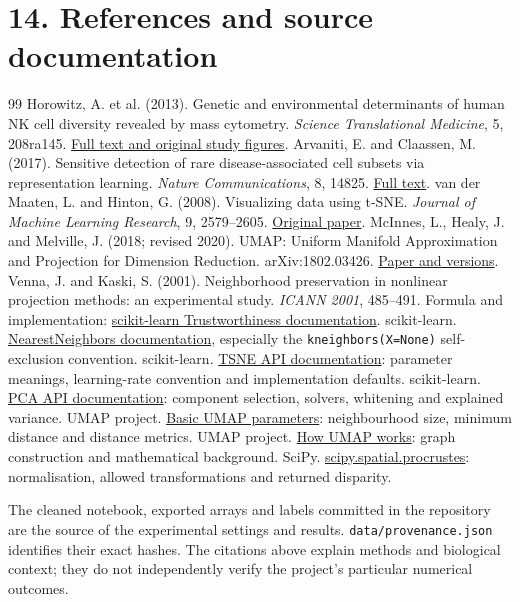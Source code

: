 \documentclass[11pt]{article}
\begin{document}
\section*{14. References and source documentation}
\begingroup\small
\renewcommand{\refname}{}
\begin{thebibliography}{99}
 Horowitz, A. et al. (2013). Genetic and environmental determinants of human NK cell diversity revealed by mass cytometry. \emph{Science Translational Medicine}, 5, 208ra145. \href{https://pmc.ncbi.nlm.nih.gov/articles/PMC3918221/}{Full text and original study figures}.
 Arvaniti, E. and Claassen, M. (2017). Sensitive detection of rare disease-associated cell subsets via representation learning. \emph{Nature Communications}, 8, 14825. \href{https://pmc.ncbi.nlm.nih.gov/articles/PMC5384229/}{Full text}.
 van der Maaten, L. and Hinton, G. (2008). Visualizing data using t-SNE. \emph{Journal of Machine Learning Research}, 9, 2579--2605. \href{https://www.jmlr.org/papers/v9/vandermaaten08a.html}{Original paper}.
 McInnes, L., Healy, J. and Melville, J. (2018; revised 2020). UMAP: Uniform Manifold Approximation and Projection for Dimension Reduction. arXiv:1802.03426. \href{https://arxiv.org/abs/1802.03426}{Paper and versions}.
 Venna, J. and Kaski, S. (2001). Neighborhood preservation in nonlinear projection methods: an experimental study. \emph{ICANN 2001}, 485--491. Formula and implementation: \href{https://scikit-learn.org/stable/modules/generated/sklearn.manifold.trustworthiness.html}{scikit-learn Trustworthiness documentation}.
 scikit-learn. \href{https://scikit-learn.org/stable/modules/generated/sklearn.neighbors.NearestNeighbors.html}{NearestNeighbors documentation}, especially the \texttt{kneighbors(X=None)} self-exclusion convention.
 scikit-learn. \href{https://scikit-learn.org/stable/modules/generated/sklearn.manifold.TSNE.html}{TSNE API documentation}: parameter meanings, learning-rate convention and implementation defaults.
 scikit-learn. \href{https://scikit-learn.org/stable/modules/generated/sklearn.decomposition.PCA.html}{PCA API documentation}: component selection, solvers, whitening and explained variance.
 UMAP project. \href{https://umap-learn.readthedocs.io/en/latest/parameters.html}{Basic UMAP parameters}: neighbourhood size, minimum distance and distance metrics.
 UMAP project. \href{https://umap-learn.readthedocs.io/en/latest/how_umap_works.html}{How UMAP works}: graph construction and mathematical background.
 SciPy. \href{https://docs.scipy.org/doc/scipy/reference/generated/scipy.spatial.procrustes.html}{scipy.spatial.procrustes}: normalisation, allowed transformations and returned disparity.
\end{thebibliography}
\endgroup
{}
The cleaned notebook, exported arrays and labels committed in the repository are the source of the experimental settings and results. \texttt{data/provenance.json} identifies their exact hashes. The citations above explain methods and biological context; they do not independently verify the project's particular numerical outcomes.
\end{document}

